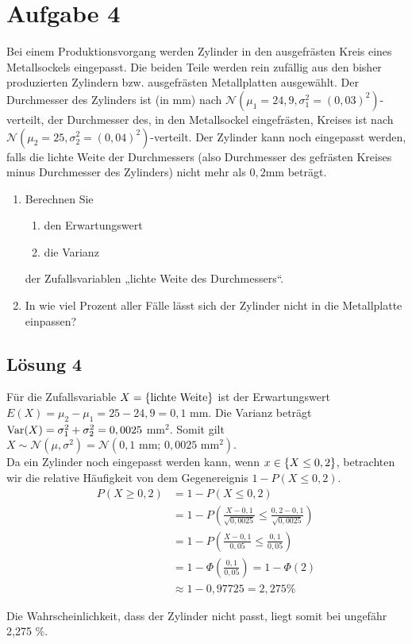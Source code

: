 \documentclass[main.tex]{subfiles}
\begin{document}
\section{Aufgabe 4}
Bei einem Produktionsvorgang werden Zylinder in den ausgefrästen Kreis eines Metallsockels eingepasst. Die beiden Teile werden rein zufällig aus den bisher produzierten Zylindern bzw. ausgefrästen Metallplatten ausgewählt. Der Durchmesser des Zylinders ist (in mm) nach $\mathcal{N}(\mu_1{=}24,9, \sigma_1^2{=}(0,03)^2)$-verteilt, der Durchmesser des, in den Metallsockel eingefrästen, Kreises ist nach $\mathcal{N}(\mu_2{=}25, \sigma_2^2 {=} (0,04)^2)$-verteilt. Der Zylinder kann noch eingepasst werden, falls die lichte Weite der Durchmessers (also Durchmesser des gefrästen Kreises minus Durchmesser des Zylinders) nicht mehr als $0,2$mm beträgt.
\begin{enumerate}
\item Berechnen Sie
\begin{enumerate}
\item den Erwartungswert
\item die Varianz
\end{enumerate}
der Zufallsvariablen „lichte Weite des Durchmessers“.
\item In wie viel Prozent aller Fälle lässt sich der Zylinder nicht in die Metallplatte einpassen?
\end{enumerate}

\subsection{Lösung 4}
Für die Zufallsvariable $X=\{\text{lichte Weite}\}$ ist der Erwartungswert $E(X) = \mu_2 - \mu_1 = 25 - 24,9 = 0,1$ mm.
Die Varianz beträgt $\operatorname{Var}(X) = \sigma_1^2 + \sigma_2^2 = 0,0025$ mm$^2$.
Somit gilt $X\sim\mathcal{N}(\mu, \sigma^2) = \mathcal{N}(0,1\mbox{ mm};\, 0,0025\mbox{ mm}^2)$.\\

Da ein Zylinder noch eingepasst werden kann, wenn $x\in\{X\leq 0,2\}$, betrachten wir die relative Häufigkeit von dem Gegenereignis $1 - P(X\leq 0,2)$.
$$\begin{aligned}
    P(X\geq 0,2) &= 1 - P(X\leq 0,2) \\[2mm]
    &= 1 - P\left( \frac{X - 0,1}{\sqrt{0,0025}} \leq \frac{0,2 - 0,1}{\sqrt{0,0025}}\right) \\[2mm]
    &= 1 - P\left( \frac{X - 0,1}{0,05} \leq \frac{0,1}{0,05}\right) \\[2mm]
    &= 1 - \Phi\left(\frac{0,1}{0,05}\right) = 1 - \Phi(2) \\[2mm]
    &\approx 1 - 0,97725 = 2,275 \%
\end{aligned}$$

Die Wahrscheinlichkeit, dass der Zylinder nicht passt, liegt somit bei ungefähr 2,275 \%.
\end{document}
